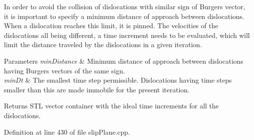 \-In order to avoid the collision of dislocations with similar sign of \-Burgers vector, it is important to specify a minimum distance of approach between dislocations. \-When a dislocation reaches this limit, it is pinned. \-The velocities of the dislocations all being different, a time increment needs to be evaluated, which will limit the distance traveled by the dislocations in a given iteration. 
\begin{DoxyParams}{\-Parameters}
{\em min\-Distance} & \-Minimum distance of approach between dislocations having \-Burgers vectors of the same sign. \\
\hline
{\em min\-Dt} & \-The smallest time step permissible. \-Dislocations having time steps smaller than this are made immobile for the present iteration. \\
\hline
\end{DoxyParams}
\begin{DoxyReturn}{\-Returns}
\-S\-T\-L vector container with the ideal time increments for all the dislocations. 
\end{DoxyReturn}


\-Definition at line 430 of file slip\-Plane.\-cpp.


